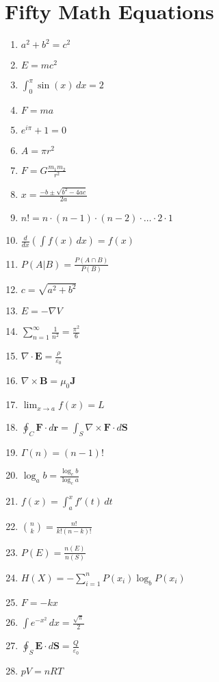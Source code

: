 \documentclass{article}
\begin{document}
\section*{Fifty Math Equations}

\begin{enumerate}
    \item $a^2 + b^2 = c^2$
    \item $E=mc^2$
    \item $\int_{0}^{\pi} \sin(x) \, dx = 2$
    \item $F = ma$
    \item $e^{i\pi} + 1 = 0$
    \item $A = \pi r^2$
    \item $F = G \frac{m_1m_2}{r^2}$
    \item $x = \frac{-b \pm \sqrt{b^2 - 4ac}}{2a}$
    \item $n! = n \cdot (n-1) \cdot (n-2) \cdot \ldots \cdot 2 \cdot 1$
    \item $\frac{d}{dx} \left( \int f(x) \, dx \right) = f(x)$
    \item $P(A|B) = \frac{P(A \cap B)}{P(B)}$
    \item $c = \sqrt{a^2 + b^2}$
    \item $E = -\nabla V$
    \item $\sum_{n=1}^{\infty} \frac{1}{n^2} = \frac{\pi^2}{6}$
    \item $\nabla \cdot \mathbf{E} = \frac{\rho}{\varepsilon_0}$
    \item $\nabla \times \mathbf{B} = \mu_0 \mathbf{J}$
    \item $\lim_{x\to a} f(x) = L$
    \item $\oint_C \mathbf{F} \cdot d\mathbf{r} = \int_S \nabla \times \mathbf{F} \cdot d\mathbf{S}$
    \item $\Gamma(n) = (n-1)!$
    \item $\log_a b = \frac{\log_c b}{\log_c a}$
    \item $f(x) = \int_a^x f'(t) \, dt$
    \item $\binom{n}{k} = \frac{n!}{k!(n-k)!}$
    \item $P(E) = \frac{n(E)}{n(S)}$
    \item $H(X) = -\sum_{i=1}^n P(x_i) \log_b P(x_i)$
    \item $F = -kx$
    \item $\int e^{-x^2} \, dx = \frac{\sqrt{\pi}}{2}$
    \item $\oint_S \mathbf{E} \cdot d\mathbf{S} = \frac{Q}{\varepsilon_0}$
    \item $pV = nRT$

\end{enumerate}
\end{document}
